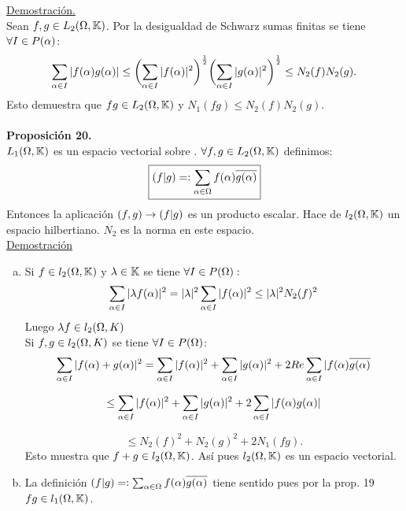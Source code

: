 \underline{Demostración.}\\
Sean $f,g \in L_2 (\Omega ,\mathbb{K})$. Por la desigualdad de Schwarz sumas finitas se tiene $\forall I \in P (\alpha)$:
\begin{equation*}
\sum_{\alpha \in I}| f(\alpha) g(\alpha)| \leq \biggl( \sum_{\alpha \in I}| f(\alpha)|^2 \biggr)^\frac{1}{2} \biggl( \sum_{\alpha \in I}| g(\alpha)|^2 \biggr)^\frac{1}{2} \leq N_2(f) N_2(g).
\end{equation*}
Esto demuestra que $fg \in L_2 (\Omega ,\mathbb{K})$ y $N_1(fg) \leq N_2 (f) N_2(g)$. \\ \\
\textbf{Proposición 20.} \\
$L_1(\Omega , \mathbb{K})$ es un espacio vectorial sobre \K . $\forall f,g \in L_2 (\Omega,\mathbb{K})$ definimos:
\begin{equation*}
\boxed{(f|g)=: \sum_{\alpha \in \Omega}f(\alpha) \overline{g(\alpha)}}
\end{equation*}
Entonces la aplicación $(f,g) \rightarrow (f | g)$ es un producto escalar. Hace de $l_2 (\Omega ,\mathbb{K})$ un espacio hilbertiano. $N_2$ es la norma en este espacio.\\
\underline{Demostración} \\
\begin{enumerate}[a)]
\item Si $f\in l_2 (\Omega , \mathbb{K})$ y $\lambda \in \mathbb{K}$ se tiene $\forall I \in P (\Omega):$
$$
\sum_{\alpha \in I} | \lambda f(\alpha)|^2=| \lambda |^2 \sum_{\alpha \in I} | f(\alpha )|^2 \leq | \lambda |^2 N_2 (f)^2
$$
Luego $\lambda f \in l_2 (\Omega ,K)$ \\
Si $f,g \in l_2 (\Omega , K)$ se tiene $\forall I \in P(\Omega)$:
$$
\sum_{\alpha \in I}| f(\alpha) + g(\alpha ) |^2 =\sum_{\alpha \in I}| f(\alpha )|^2+\sum_{\alpha \in I}| g(\alpha )|^2+2Re \sum_{\alpha \in I}| f(\alpha )\overline{g(\alpha)}
$$

$$
\leq \sum_{\alpha \in I}| f(\alpha )|^2+\sum_{\alpha \in I}| g(\alpha )|^2 + 2 \sum_{\alpha \in I}| f(\alpha ) g(\alpha)| 
$$

$$
\leq N_2(f)^2+N_2(g)^2+2N_1(fg).
$$
Esto muestra que $f+g \in l_2 (\Omega,\mathbb{K})$. Así pues $l_2 (\Omega,\mathbb{K})$ es un espacio vectorial.
\item La definición $(f|g)=: \sum_{\alpha \in \Omega}f(\alpha) \overline{g(\alpha)}$ tiene sentido pues por la prop. 19 $fg\in l_1 (\Omega,\mathbb{K})$.
\end{enumerate}


